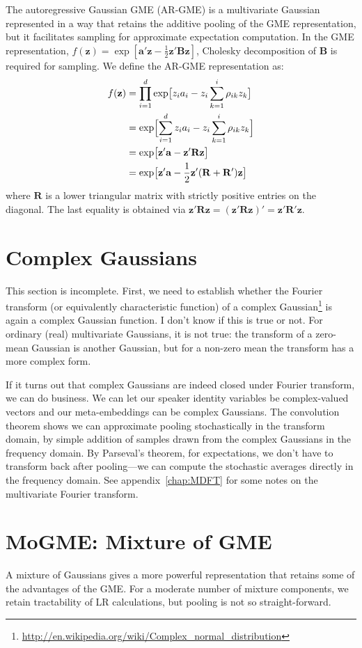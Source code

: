 \documentclass[a4paper,oneside,12pt,english]{report}
\def\zvec{\mathbf{z}}
\def\Bmat{\mathbf{B}}
\def\Rmat{\mathbf{R}}
\def\avec{\mathbf{a}}
\def\normal#1{\overline{#1}}
\begin{document}
The autoregressive Gaussian GME (AR-GME) is a multivariate Gaussian represented in a way that retains the additive pooling of the GME representation, but it facilitates sampling for approximate expectation computation. In the GME representation, $f(\zvec)=\exp[\avec'\zvec -\frac12\zvec'\Bmat\zvec]$, Cholesky decomposition of $\Bmat$ is required for sampling. We define the AR-GME representation as:
\begin{align}
f(\zvec) &= \prod_{i=1}^d \exp\bigl[z_ia_i - z_i\sum_{k=1}^{i} \rho_{ik} z_k\bigr] \\
&= \exp\Bigl[\sum_{i=1}^d z_ia_i - z_i\sum_{k=1}^{i} \rho_{ik} z_k\Bigr] \\
&= \exp\bigl[\zvec'\avec - \zvec'\Rmat\zvec\bigr] \\
&= \exp\bigl[\zvec'\avec - \frac12\zvec'(\Rmat+\Rmat')\zvec\bigr]
\end{align}
where $\Rmat$ is a lower triangular matrix with strictly positive entries on the diagonal. The last equality is obtained via $\zvec'\Rmat\zvec=(\zvec'\Rmat\zvec)'=\zvec'\Rmat'\zvec$.


\section{Complex Gaussians}
This section is incomplete. First, we need to establish whether the Fourier transform (or equivalently characteristic function) of a complex Gaussian\footnote{\url{http://en.wikipedia.org/wiki/Complex_normal_distribution}} is again a complex Gaussian function. I don't know if this is true or not. For ordinary (real) multivariate Gaussians, it is not true: the transform of a zero-mean Gaussian is another Gaussian, but for a non-zero mean the transform has a more complex form.  

If it turns out that complex Gaussians are indeed closed under Fourier transform, we can do business. We can let our speaker identity variables be complex-valued vectors and our meta-embeddings can be complex Gaussians. The convolution theorem shows we can approximate pooling stochastically in the transform domain, by simple addition of samples drawn from the complex Gaussians in the frequency domain. By Parseval's theorem, for expectations, we don't have to transform back after pooling---we can compute the stochastic averages directly in the frequency domain. See appendix~\ref{chap:MDFT} for some notes on the multivariate Fourier transform. 



\section{MoGME: Mixture of GME}
\def\GME{\text{GME}}
\def\nGME{\normal{\GME}}
A mixture of Gaussians gives a more powerful representation that retains some of the advantages of the GME. For a moderate number of mixture components, we retain tractability of LR calculations, but pooling is not so straight-forward.
\end{document}
